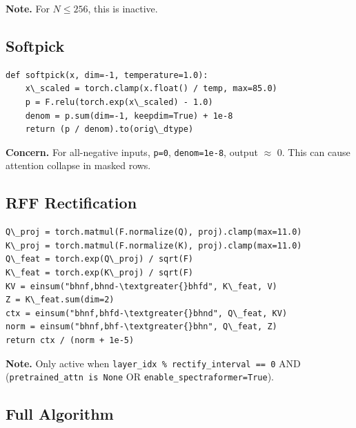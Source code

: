 \textbf{Note.} For $N \leq 256$, this is inactive.

\subsection{Softpick}

\begin{lstlisting}
def softpick(x, dim=-1, temperature=1.0):
    x\_scaled = torch.clamp(x.float() / temp, max=85.0)
    p = F.relu(torch.exp(x\_scaled) - 1.0)
    denom = p.sum(dim=-1, keepdim=True) + 1e-8
    return (p / denom).to(orig\_dtype)
\end{lstlisting}

\textbf{Concern.} For all-negative inputs, \texttt{p=0}, \texttt{denom=1e-8}, output $\approx$ 0. 
This can cause attention collapse in masked rows.

\subsection{RFF Rectification}

\begin{lstlisting}
Q\_proj = torch.matmul(F.normalize(Q), proj).clamp(max=11.0)
K\_proj = torch.matmul(F.normalize(K), proj).clamp(max=11.0)
Q\_feat = torch.exp(Q\_proj) / sqrt(F)
K\_feat = torch.exp(K\_proj) / sqrt(F)
KV = einsum("bhnf,bhnd-\textgreater{}bhfd", K\_feat, V)
Z = K\_feat.sum(dim=2)
ctx = einsum("bhnf,bhfd-\textgreater{}bhnd", Q\_feat, KV)
norm = einsum("bhnf,bhf-\textgreater{}bhn", Q\_feat, Z)
return ctx / (norm + 1e-5)
\end{lstlisting}

\textbf{Note.} Only active when \texttt{layer\_idx \% rectify\_interval == 0} AND (\texttt{pretrained\_attn is None} OR \texttt{enable\_spectraformer=True}).

\subsection{Full Algorithm}

